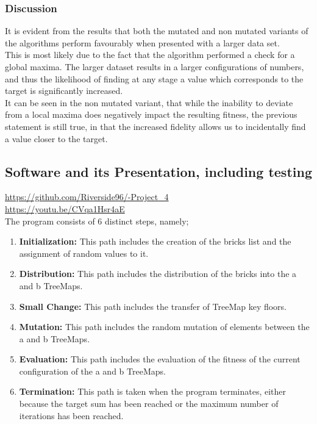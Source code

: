 \documentclass[a4paper]{article}
\begin{document}
\subsubsection{Discussion}

It is evident from the results that both the mutated and non mutated variants
of the algorithms perform favourably when presented with a larger data set. \\

This is most likely due to the fact that the algorithm performed a check for 
a global maxima.
The larger dataset results in a larger configurations of numbers,
and thus the likelihood of finding at any stage a value which 
corresponds to the target is significantly increased. \\

It can be seen in the non mutated variant, that while the inability to deviate from
a local maxima does negatively impact the resulting fitness, the previous statement is still true, 
in that the increased fidelity allows us to incidentally find a value closer to the target.



\newpage
\subsection{Software and its Presentation, including testing}
\vspace{4mm}
\url{https://github.com/Riverside96/-Project_4} \\
\url{https://youtu.be/CVqa1Hsr4aE} \\
 
The program consists of 6 distinct steps, namely;
\vspace{4mm}
\begin{enumerate}
  \item \textbf{Initialization:} This path includes the creation of the bricks list and the assignment of random values to it.
  \item \textbf{Distribution:} This path includes the distribution of the bricks into the a and b TreeMaps.
  \item \textbf{Small Change:} This path includes the transfer of TreeMap key floors.
  \item \textbf{Mutation:} This path includes the random mutation of elements between the a and b TreeMaps.
  \item \textbf{Evaluation:} This path includes the evaluation of the fitness of the current configuration of the a and b TreeMaps.
  \item \textbf{Termination:} This path is taken when the program terminates, either because the target sum has been reached or the maximum number of iterations has been reached.
  \end{enumerate}
\end{document}
